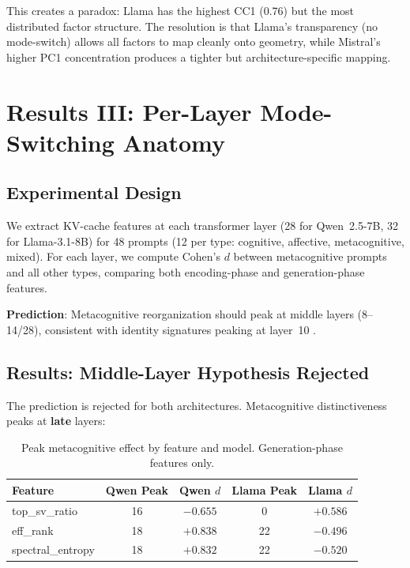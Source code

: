 \documentclass[11pt,a4paper]{article}
\begin{document}
This creates a paradox: Llama has the highest CC1 (0.76) but the most distributed factor structure. The resolution is that Llama's transparency (no mode-switch) allows all factors to map cleanly onto geometry, while Mistral's higher PC1 concentration produces a tighter but architecture-specific mapping.

\section{Results III: Per-Layer Mode-Switching Anatomy}

\subsection{Experimental Design}

We extract KV-cache features at each transformer layer (28 for Qwen~2.5-7B, 32 for Llama-3.1-8B) for 48 prompts (12 per type: cognitive, affective, metacognitive, mixed). For each layer, we compute Cohen's $d$ between metacognitive prompts and all other types, comparing both encoding-phase and generation-phase features.

\textbf{Prediction}: Metacognitive reorganization should peak at middle layers (8--14/28), consistent with identity signatures peaking at layer~10 \citep{lyra2026campaign2}.

\subsection{Results: Middle-Layer Hypothesis Rejected}

The prediction is rejected for both architectures. Metacognitive distinctiveness peaks at \textbf{late} layers:

\begin{table}[H]
\centering
\caption{Peak metacognitive effect by feature and model. Generation-phase features only.}
\label{tab:exp_a_peaks}
\begin{tabular}{lcccc}
\toprule
\textbf{Feature} & \textbf{Qwen Peak} & \textbf{Qwen $d$} & \textbf{Llama Peak} & \textbf{Llama $d$} \\
\midrule
top\_sv\_ratio & 16 & $-0.655$ & 0  & $+0.586$ \\
eff\_rank      & 18 & $+0.838$ & 22 & $-0.496$ \\
spectral\_entropy & 18 & $+0.832$ & 22 & $-0.520$ \\
\bottomrule
\end{tabular}
\end{table}
\end{document}
